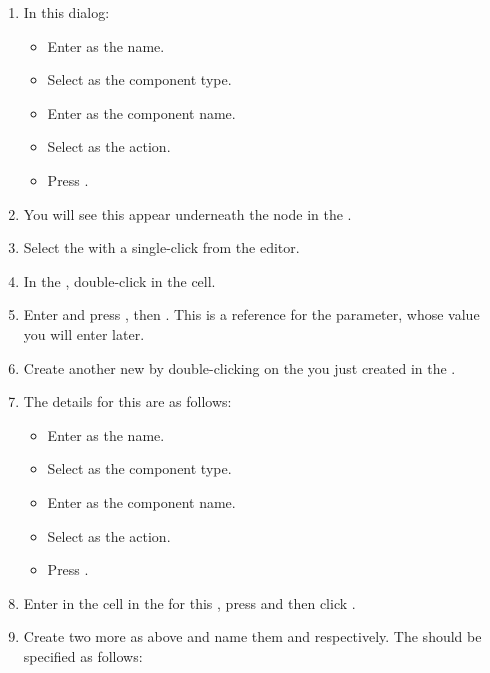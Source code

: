 \begin{enumerate}
 \item In this dialog:
\begin{itemize}
\item Enter  as the name.
\item Select  as the component type.
\item Enter  as the component name.
\item Select  as the action.
\item Press .
\end{itemize}
\item You will see this \gdstep{} appear underneath the \gdcase{} node in the \gdtestcaseeditor{}.
\item Select the \gdstep{} with a single-click from the editor. 
\item In the \gdpropview{}, double-click in the  cell. 
\item Enter  and press , then . This is a reference for the parameter, whose value you will enter later. 
\item Create another new \gdstep{} by double-clicking on the \gdstep{} you just created in the \gdtestcaseeditor{}. 
\item The details for this \gdstep{} are as follows:
\begin{itemize}
\item Enter  as the name.
\item Select  as the component type.
\item Enter  as the component name.
\item Select  as the action.
\item Press .
\end{itemize}
\item Enter  in the  cell in the \gdpropview{} for this \gdstep{}, press  and then click .
\item Create two more \gdsteps{} as above and name them  and 
 respectively. The \gdsteps{} should be specified as follows:


\end{enumerate}
